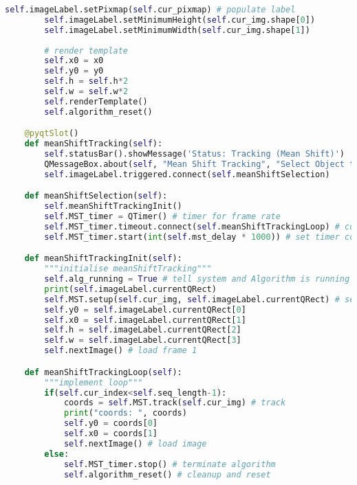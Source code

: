 \begin{lstlisting}[language=Python, caption={GUI Impementation Code}, captionpos=b, label={lst:gui}]
        self.imageLabel.setPixmap(self.cur_pixmap) # populate label
        self.imageLabel.setMinimumHeight(self.cur_img.shape[0])
        self.imageLabel.setMinimumWidth(self.cur_img.shape[1])
        
        # render template
        self.x0 = x0
        self.y0 = y0
        self.h = self.h*2
        self.w = self.w*2
        self.renderTemplate()
        self.algorithm_reset()

    @pyqtSlot()
    def meanShiftTracking(self):
        self.statusBar().showMessage('Status: Tracking (Mean Shift)')
        QMessageBox.about(self, "Mean Shift Tracking", "Select Object to Track")
        self.imageLabel.triggered.connect(self.meanShiftSelection)

    def meanShiftSelection(self):
        self.meanShiftTrackingInit()
        self.MST_timer = QTimer() # timer for frame rate
        self.MST_timer.timeout.connect(self.meanShiftTrackingLoop) # connect timeouts to fetching next image
        self.MST_timer.start(int(self.mst_delay * 1000)) # set timer countdown rate

    def meanShiftTrackingInit(self):
        """initialise meanShiftTracking"""
        self.alg_running = True # tell system and Algorithm is running
        print(self.imageLabel.currentQRect)
        self.MST.setup(self.cur_img, self.imageLabel.currentQRect) # setup mean shift tracker with coords
        self.y0 = self.imageLabel.currentQRect[0]
        self.x0 = self.imageLabel.currentQRect[1]
        self.h = self.imageLabel.currentQRect[2]
        self.w = self.imageLabel.currentQRect[3]
        self.nextImage() # load frame 1

    def meanShiftTrackingLoop(self):
        """implement loop"""   
        if(self.cur_index<self.seq_length-1):
            coords = self.MST.track(self.cur_img) # track    
            print("coords: ", coords)
            self.y0 = coords[0]
            self.x0 = coords[1]
            self.nextImage() # load image    
        else:
            self.MST_timer.stop() # terminate algorithm
            self.algorithm_reset() # cleanup and reset
\end{lstlisting}


